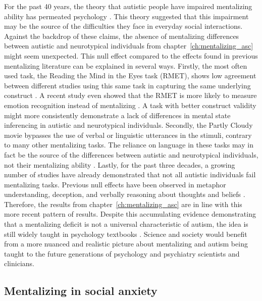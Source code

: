 For the past 40 years, the theory that autistic people have impaired mentalizing ability has permeated psychology \citep{baron-cohen1985,gernsbacher2019}. This theory suggested that this impairment may be the source of the difficulties they face in everyday social interactions. Against the backdrop of these claims, the absence of mentalizing differences between autistic and neurotypical individuals from chapter~\ref{ch:mentalizing_asc} might seem unexpected. This null effect compared to the effects found in previous mentalizing literature can be explained in several ways. Firstly, the most often used task, the Reading the Mind in the Eyes task (RMET), shows low agreement between different studies using this same task in capturing the same underlying construct \citep{higgins2024}. A recent study even showed that the RMET is more likely to measure emotion recognition instead of mentalizing \citep{oakley2016}. A task with better construct validity might more consistently demonstrate a lack of differences in mental state inferencing in autistic and neurotypical individuals. Secondly, the Partly Cloudy movie bypasses the use of verbal or linguistic utterances in the stimuli, contrary to many other mentalizing tasks. The reliance on language in these tasks may in fact be the source of the differences between autistic and neurotypical individuals, not their mentalizing ability \citep{shaked2006,capage2001,gernsbacher2005,scheeren2013}. Lastly, for the past three decades, a growing number of studies have already demonstrated that not all autistic individuals fail mentalizing tasks. Previous null effects have been observed in metaphor understanding, deception, and verbally reasoning about thoughts and beliefs \citep{happe1993, bowler1992, pantelis2017, vantiel2021, ponnet2005, scheeren2013}. Therefore, the results from chapter~\ref{ch:mentalizing_asc} are in line with this more recent pattern of results. Despite this accumulating evidence demonstrating that a mentalizing deficit is not a universal characteristic of autism, the idea is still widely taught in psychology textbooks \citep{coon2021,kellogg2016,sigelman2018,myers2014}. Science and society would benefit from a more nuanced and realistic picture about mentalizing and autism being taught to the future generations of psychology and psychiatry scientists and clinicians.

\subsection{Mentalizing in social anxiety}

